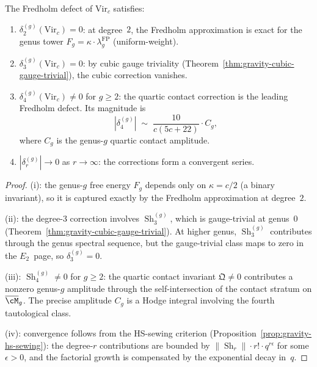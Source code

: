 \begin{proposition}
\label{prop:gravity-fredholm-defect}
The Fredholm defect of $\mathrm{Vir}_c$ satisfies:
\begin{enumerate}[label=\textup{(\roman*)}]
\item $\delta_2^{(g)}(\mathrm{Vir}_c) = 0$: at degree~$2$, the
 Fredholm approximation is exact for the genus tower
 $F_g = \kappa \cdot \lambda_g^{\mathrm{FP}}$
 \textup{(}uniform-weight\textup{)}.
\item $\delta_3^{(g)}(\mathrm{Vir}_c) = 0$: by cubic gauge
 triviality \textup{(}Theorem~\textup{\ref{thm:gravity-cubic-gauge-trivial}}\textup{)},
 the cubic correction vanishes.
\item $\delta_4^{(g)}(\mathrm{Vir}_c) \ne 0$ for $g \ge 2$:
 the quartic contact correction is the leading Fredholm defect.
 Its magnitude is
 \[
 |\delta_4^{(g)}| \;\sim\;
 \frac{10}{c(5c+22)} \cdot C_g,
 \]
 where $C_g$ is the genus-$g$ quartic contact amplitude.
\item $|\delta_r^{(g)}| \to 0$ as $r \to \infty$: the
 corrections form a convergent series.
\end{enumerate}
\end{proposition}

\begin{proof}
(i): the genus-$g$ free energy $F_g$ depends only on
$\kappa = c/2$ (a binary invariant), so it is captured
exactly by the Fredholm approximation at degree~$2$.

(ii): the degree-$3$ correction involves
$\operatorname{Sh}_3^{(g)}$, which is gauge-trivial at
genus~$0$ (Theorem~\ref{thm:gravity-cubic-gauge-trivial}).
At higher genus, $\operatorname{Sh}_3^{(g)}$ contributes
through the genus spectral sequence, but the gauge-trivial
class maps to zero in the $E_2$~page, so
$\delta_3^{(g)} = 0$.

(iii): $\operatorname{Sh}_4^{(g)} \ne 0$ for $g \ge 2$:
the quartic contact invariant $\mathfrak{Q} \ne 0$ contributes
a nonzero genus-$g$ amplitude through the self-intersection
of the contact stratum on $\overline{\cM}_g$. The precise
amplitude $C_g$ is a Hodge integral involving the fourth
tautological class.

(iv): convergence follows from the HS-sewing criterion
(Proposition~\ref{prop:gravity-hs-sewing}): the degree-$r$
contributions are bounded by
$\|\operatorname{Sh}_r\| \cdot r! \cdot q^{r\epsilon}$ for some
$\epsilon > 0$, and the factorial growth is compensated by the
exponential decay in~$q$.
\end{proof}

